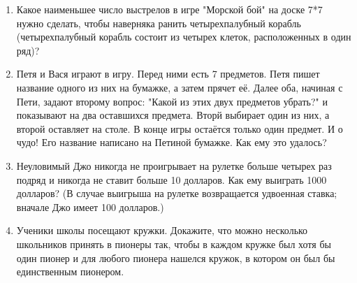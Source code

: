 \documentclass[a4paper,12pt]{article}
\begin{document}
\begin{enumerate}
    \item Какое наименьшее число выстрелов в игре "Морской бой" на доске 7*7 нужно сделать, чтобы наверняка ранить четырехпалубный корабль (четырехпалубный корабль состоит из четырех клеток, расположенных в один ряд)?
    \item Петя и Вася играют в игру. Перед ними есть 7 предметов. Петя пишет название одного из них на бумажке, а затем прячет её. Далее оба,  начиная с Пети, задают второму вопрос: "Какой из этих двух предметов убрать?" и показывают на два оставшихся предмета. Вторй выбирает один из них, а второй оставляет на столе. В конце игры остаётся только один предмет. И о чудо! Его название написано на Петиной бумажке. Как ему это удалось?
    \item Неуловимый Джо никогда не проигрывает на рулетке больше четырех раз подряд и никогда не ставит больше 10 долларов. Как ему выиграть 1000 долларов? (В случае выигрыша на рулетке возвращается удвоенная ставка; вначале Джо имеет 100 долларов.)
    \item Ученики школы посещают кружки. Докажите, что можно несколько школьников принять в пионеры так, чтобы в каждом кружке был хотя бы один пионер и для любого пионера нашелся кружок, в котором он был бы единственным пионером.
        
    \end{enumerate}
\end{document}

